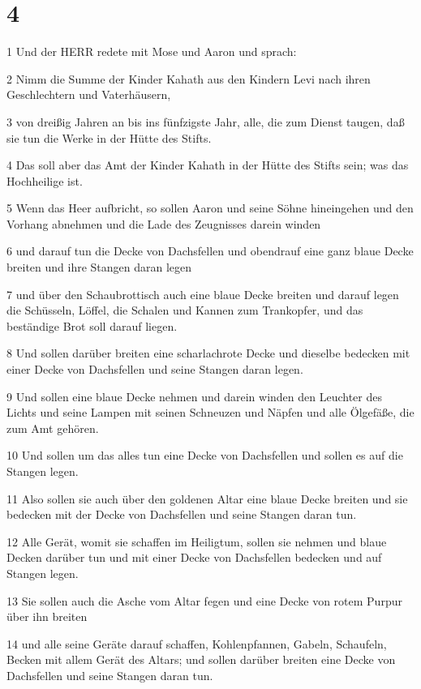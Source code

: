 \chapter{4}

\par 1 Und der HERR redete mit Mose und Aaron und sprach:
\par 2 Nimm die Summe der Kinder Kahath aus den Kindern Levi nach ihren Geschlechtern und Vaterhäusern,
\par 3 von dreißig Jahren an bis ins fünfzigste Jahr, alle, die zum Dienst taugen, daß sie tun die Werke in der Hütte des Stifts.
\par 4 Das soll aber das Amt der Kinder Kahath in der Hütte des Stifts sein; was das Hochheilige ist.
\par 5 Wenn das Heer aufbricht, so sollen Aaron und seine Söhne hineingehen und den Vorhang abnehmen und die Lade des Zeugnisses darein winden
\par 6 und darauf tun die Decke von Dachsfellen und obendrauf eine ganz blaue Decke breiten und ihre Stangen daran legen
\par 7 und über den Schaubrottisch auch eine blaue Decke breiten und darauf legen die Schüsseln, Löffel, die Schalen und Kannen zum Trankopfer, und das beständige Brot soll darauf liegen.
\par 8 Und sollen darüber breiten eine scharlachrote Decke und dieselbe bedecken mit einer Decke von Dachsfellen und seine Stangen daran legen.
\par 9 Und sollen eine blaue Decke nehmen und darein winden den Leuchter des Lichts und seine Lampen mit seinen Schneuzen und Näpfen und alle Ölgefäße, die zum Amt gehören.
\par 10 Und sollen um das alles tun eine Decke von Dachsfellen und sollen es auf die Stangen legen.
\par 11 Also sollen sie auch über den goldenen Altar eine blaue Decke breiten und sie bedecken mit der Decke von Dachsfellen und seine Stangen daran tun.
\par 12 Alle Gerät, womit sie schaffen im Heiligtum, sollen sie nehmen und blaue Decken darüber tun und mit einer Decke von Dachsfellen bedecken und auf Stangen legen.
\par 13 Sie sollen auch die Asche vom Altar fegen und eine Decke von rotem Purpur über ihn breiten
\par 14 und alle seine Geräte darauf schaffen, Kohlenpfannen, Gabeln, Schaufeln, Becken mit allem Gerät des Altars; und sollen darüber breiten eine Decke von Dachsfellen und seine Stangen daran tun.
